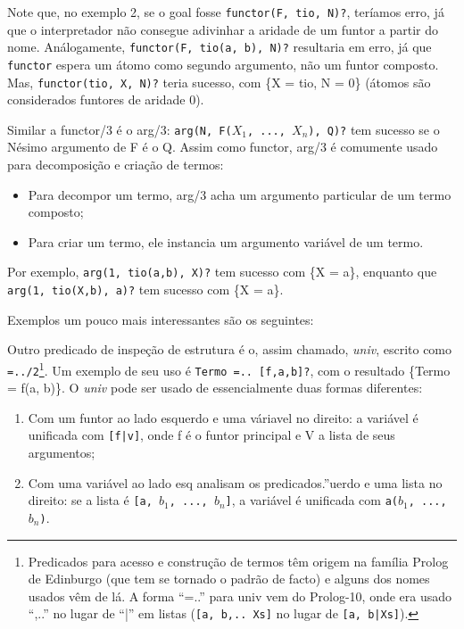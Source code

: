 \documentclass{article}
\theoremstyle{remark}
\theoremstyle{theorem}
\begin{document}
Note que, no exemplo 2, se o goal fosse {\tt functor(F, tio, N)?}, teríamos erro, já que o interpretador não consegue adivinhar a aridade de um funtor a partir do nome. Análogamente, {\tt functor(F, tio(a, b), N)?} resultaria em erro, já que {\tt functor} espera um átomo como segundo argumento, não um funtor composto. Mas, {\tt functor(tio, X, N)?} teria sucesso, com \{X = tio, N = 0\} (átomos são considerados funtores de aridade 0).

Similar a functor/3 é o arg/3: {\tt arg(N, F($X_1$, ..., $X_n$), Q)?} tem sucesso se o Nésimo argumento de F é o Q. Assim como functor, arg/3 é comumente usado para decomposição e criação de termos:
\begin{itemize}
  \item Para decompor um termo, arg/3 acha um argumento particular de um termo composto;
  \item Para criar um termo, ele instancia um argumento variável de um termo.
\end{itemize}

Por exemplo, {\tt arg(1, tio(a,b), X)?} tem sucesso com \{X = a\}, enquanto que {\tt arg(1, tio(X,b), a)?} tem sucesso com \{X = a\}.

Exemplos um pouco mais interessantes são os seguintes:





Outro predicado de inspeção de estrutura é o, assim chamado, \textit{univ}, escrito como {\tt =../2}\footnote{Predicados para acesso e construção de termos têm origem na família Prolog de Edinburgo (que tem se tornado o padrão de facto) e alguns dos nomes usados vêm de lá. A forma “=..” para univ vem do Prolog-10, onde era usado “,..” no lugar de “|” em listas ({\tt[a, b,.. Xs]} no lugar de {\tt [a, b|Xs]}).}. Um exemplo de seu uso é {\tt Termo =.. [f,a,b]?}, com o resultado \{Termo = f(a, b)\}.
O \textit{univ} pode ser usado de essencialmente duas formas diferentes:
\begin{enumerate}
  \item Com um funtor ao lado esquerdo e uma váriavel no direito: a variável é unificada com {\tt [f|v]}, onde f é o funtor principal e V a lista de seus argumentos;
  \item Com uma variável ao lado esq analisam os predicados.''uerdo e uma lista no direito: se a lista é {\tt [a, $b_1$, ..., $b_n$]}, a variável é unificada com {\tt a($b_1$, ..., $b_n$)}.
\end{enumerate}
\end{document}
